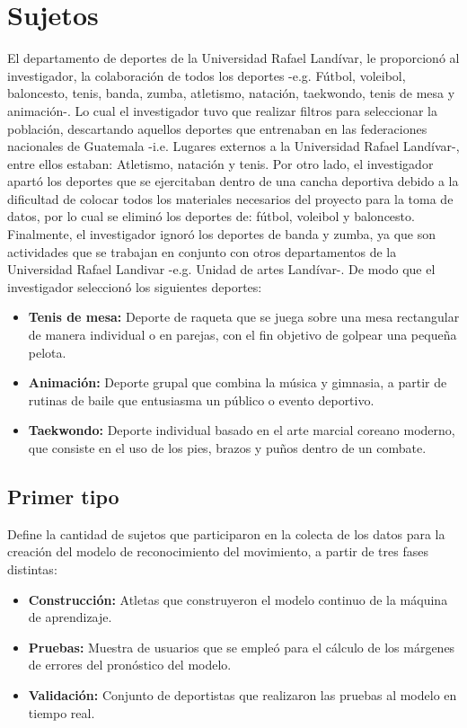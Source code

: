 \section{Sujetos}
El departamento de deportes de la Universidad Rafael Land\'ivar, le proporcion\'o al investigador, la colaboraci\'on de todos los deportes -e.g. F\'utbol, voleibol, baloncesto, tenis, banda, zumba, atletismo, nataci\'on, taekwondo, tenis de mesa y animaci\'on-. Lo cual el investigador tuvo que realizar filtros para seleccionar la poblaci\'on, descartando aquellos deportes que entrenaban en las federaciones nacionales de Guatemala -i.e. Lugares externos a la Universidad Rafael Land\'ivar-, entre ellos estaban: Atletismo, nataci\'on y tenis. Por otro lado, el investigador apart\'o los deportes que se ejercitaban dentro de una cancha deportiva debido a la dificultad de colocar todos los materiales necesarios del proyecto para la toma de datos, por lo cual se elimin\'o los deportes de:  f\'utbol, voleibol y baloncesto. Finalmente, el investigador ignor\'o los deportes de banda y zumba, ya que son actividades que se trabajan en conjunto con otros departamentos de la Universidad Rafael Landivar -e.g. Unidad de artes Land\'ivar-. De modo que el investigador seleccion\'o los siguientes deportes:
\begin{itemize}
	\item \textbf{Tenis de mesa:} Deporte de raqueta que se juega sobre una mesa rectangular de manera individual o en parejas, con el fin objetivo de golpear una peque\~na pelota.
	\item \textbf{Animaci\'on:} Deporte grupal que combina la m\'usica y gimnasia, a partir de rutinas de baile que entusiasma un p\'ublico o evento deportivo.
	\item \textbf{Taekwondo:} Deporte individual basado en el arte marcial coreano moderno, que consiste en el uso de los pies, brazos y pu\~nos dentro de un combate.
\end{itemize}
\subsection{Primer tipo} \label{sj:1t}
Define la cantidad de sujetos que participaron en la colecta de los datos para la creaci\'on del modelo de reconocimiento del movimiento, a partir de tres fases distintas:
\begin{itemize}
	\item \textbf{Construcci\'on:} Atletas que construyeron el modelo continuo de la m\'aquina de aprendizaje.
	\item \textbf{Pruebas:} Muestra de usuarios que se emple\'o para el c\'alculo de los m\'argenes de  errores del pron\'ostico del modelo.
	\item \textbf{Validaci\'on:} Conjunto de deportistas que realizaron las pruebas al modelo en tiempo real.
\end{itemize}
